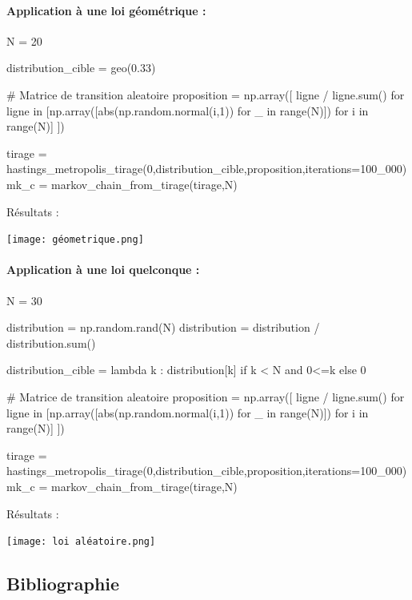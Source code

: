 \documentclass{article}
\begin{document}
\newpage
\paragraph{Application à une loi géométrique :}
\begin{center}
\begin{python}
N = 20

distribution_cible = geo(0.33)

# Matrice de transition aleatoire
proposition = np.array([ ligne / ligne.sum()
    for ligne in [np.array([abs(np.random.normal(i,1)) for _ in range(N)]) for i in range(N)]
])

tirage = hastings_metropolis_tirage(0,distribution_cible,proposition,iterations=100_000)
mk_c = markov_chain_from_tirage(tirage,N)
\end{python}
\end{center}
Résultats :

\texttt{[image: géometrique.png]}

\newpage
\paragraph{Application à une loi quelconque :}
\begin{center}
\begin{python}
N = 30

distribution = np.random.rand(N)
distribution = distribution / distribution.sum()

distribution_cible = lambda k : distribution[k] if k < N and 0<=k else 0

# Matrice de transition aleatoire
proposition = np.array([ ligne / ligne.sum()
    for ligne in [np.array([abs(np.random.normal(i,1)) for _ in range(N)]) for i in range(N)]
])

tirage = hastings_metropolis_tirage(0,distribution_cible,proposition,iterations=100_000)
mk_c = markov_chain_from_tirage(tirage,N)
\end{python}
\end{center}
Résultats :

\texttt{[image: loi aléatoire.png]}


\newpage
\subsection{Bibliographie}
\end{document}
